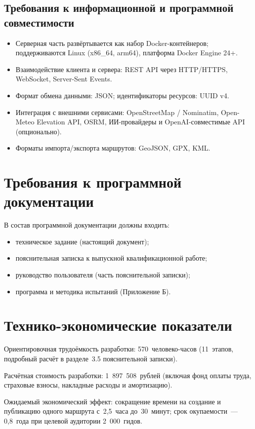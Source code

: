 \subsection{Требования к информационной и программной совместимости}

\begin{itemize}
  \item Серверная часть развёртывается как набор Docker-контейнеров; поддерживаются Linux (x86\_64, arm64), платформа Docker Engine 24+.
  \item Взаимодействие клиента и сервера: REST API через HTTP/HTTPS, WebSocket, Server-Sent Events.
  \item Формат обмена данными: JSON; идентификаторы ресурсов: UUID v4.
  \item Интеграция с внешними сервисами: OpenStreetMap / Nominatim, Open-Meteo Elevation API, OSRM, ИИ-провайдеры и OpenAI-совместимые API (опционально).
  \item Форматы импорта/экспорта маршрутов: GeoJSON, GPX, KML.
\end{itemize}

\section{Требования к программной документации}

В состав программной документации должны входить:
\begin{itemize}
  \item техническое задание (настоящий документ);
  \item пояснительная записка к выпускной квалификационной работе;
  \item руководство пользователя (часть пояснительной записки);
  \item программа и методика испытаний (Приложение Б).
\end{itemize}

\section{Технико-экономические показатели}

Ориентировочная трудоёмкость разработки: 570~человеко-часов (11~этапов, подробный расчёт в разделе~3.5 пояснительной записки).

Расчётная стоимость разработки: 1~897~508~рублей (включая фонд оплаты труда, страховые взносы, накладные расходы и амортизацию).

Ожидаемый экономический эффект: сокращение времени на создание и публикацию одного маршрута с~2,5~часа до~30~минут; срок окупаемости~--- 0,8~года при целевой аудитории 2~000~гидов.

